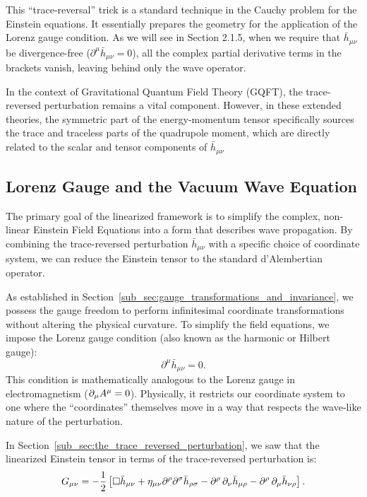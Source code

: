 This ``trace-reversal'' trick is a standard technique in the Cauchy problem for the Einstein equations. It essentially prepares the geometry for the application of the Lorenz gauge condition. As we will see in Section 2.1.5, when we require that $\bar{h}_{\mu\nu}$ be divergence-free ($\partial^\mu \bar{h}_{\mu\nu} = 0$), all the complex partial derivative terms in the brackets vanish, leaving behind only the wave operator.

In the context of Gravitational Quantum Field Theory (GQFT), the trace-reversed perturbation remains a vital component. However, in these extended theories, the symmetric part of the energy-momentum tensor specifically sources the trace and traceless parts of the quadrupole moment, which are directly related to the scalar and tensor components of $\bar{h}_{\mu\nu}$

\subsection{Lorenz Gauge and the Vacuum Wave Equation}
\label{sub_sec:lorenz_gauge_and_the_vacuum_wave_equation}

The primary goal of the linearized framework is to simplify the complex, non-linear Einstein Field Equations into a form that describes wave propagation. By combining the trace-reversed perturbation $\bar{h}_{\mu\nu}$ with a specific choice of coordinate system, we can reduce the Einstein tensor to the standard d'Alembertian operator.

As established in Section~\ref{sub_sec:gauge_transformations_and_invariance}, we possess the gauge freedom to perform infinitesimal coordinate transformations without altering the physical curvature. To simplify the field equations, we impose the Lorenz gauge condition (also known as the harmonic or Hilbert gauge):
\[%
  \partial^{\mu}\bar{h}_{\mu\nu} = 0
.\]%
This condition is mathematically analogous to the Lorenz gauge in electromagnetism ($\pd{\mu}A^{\mu} = 0$). Physically, it restricts our coordinate system to one where the ``coordinates'' themselves move in a way that respects the wave-like nature of the perturbation.

In Section~\ref{sub_sec:the_trace_reversed_perturbation}, we saw that the linearized Einstein tensor in terms of the trace-reversed perturbation is:
\[%
  G_{\mu\nu} = -\frac{1}{2} \left[ \Box \bar{h}_{\mu\nu} + \eta_{\mu\nu} \partial^\rho \partial^\sigma \bar{h}_{\rho\sigma} - \partial^\rho \pd{\nu} \bar{h}_{\mu\rho} - \partial^\rho \pd{\mu} \bar{h}_{\nu\rho} \right]
.\]%

